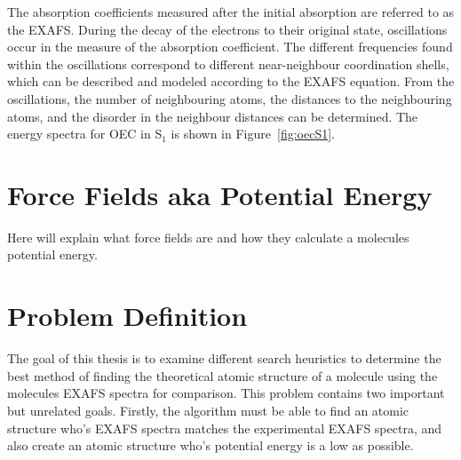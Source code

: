 The absorption coefficients measured after the initial absorption are referred to as the EXAFS. During the decay of the electrons to their original state, oscillations occur in the measure of the absorption coefficient. The different frequencies found within the oscillations correspond to different near-neighbour coordination shells, which can be described and modeled according to the EXAFS equation. From the oscillations, the number of neighbouring atoms, the distances to the neighbouring atoms, and the disorder in the neighbour distances can be determined. The energy spectra for OEC in S$_{1}$ is shown in Figure~\ref{fig:oecS1}.

\begin{figure*}
	\caption{EXAFS Spectra of OEC in S$_{1}$}
	\label{fig:oecS1}
\end{figure*}

\section{Force Fields aka Potential Energy}

Here will explain what force fields are and how they calculate a molecules potential energy.

\section{Problem Definition}

The goal of this thesis is to examine different search heuristics to determine the best method of finding the theoretical atomic structure of a molecule using the molecules EXAFS spectra for comparison. This problem contains two important but unrelated goals. Firstly, the algorithm must be able to find an atomic structure who's EXAFS spectra matches the experimental EXAFS spectra, and also create an atomic structure who's potential energy is a low as possible.

